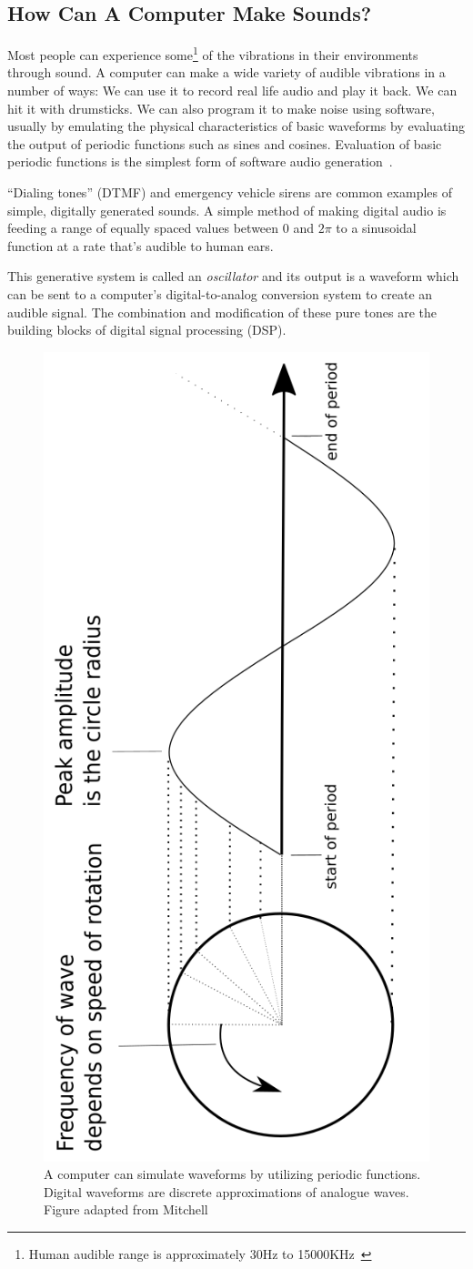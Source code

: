 \documentclass[\main/thesis.tex]{subfiles}
\begin{document}
\subsection{How Can A Computer Make Sounds?}
\label{sec:computer_make_sound}
Most people can experience some\footnote{Human audible range is approximately 30Hz to 15000KHz~\cite{zwicker1961subdivision}} of the vibrations in their environments through sound. A computer can make a wide variety of audible vibrations in a number of ways: We can use it to record real life audio and play it back. We can hit it with drumsticks. We can also program it to make noise using software, usually by emulating the physical characteristics of basic waveforms by evaluating the output of periodic functions such as sines and cosines. Evaluation of basic periodic functions is the simplest form of software audio generation~\cite{mitchell2009basicsynthChap5}.

\enquote{Dialing tones} (DTMF) and emergency vehicle sirens are common examples of simple, digitally generated sounds. A simple method of making digital audio is feeding a range of equally spaced values between 0 and $2\pi$ to a sinusoidal function at a rate that's audible to human ears. 

This generative system is called an \textit{oscillator} and its output is a waveform which can be sent to a computer's digital-to-analog conversion system to create an audible signal. The combination and modification of these pure tones are the building blocks of digital signal processing (DSP).


\begin{figure}[h]
\label{fig_example_sine}
\centering
\includegraphics[width=0.45\linewidth,angle =-90 ]{images/periodic_function.png}
\caption{A computer can simulate waveforms by utilizing periodic functions. Digital waveforms are discrete approximations of analogue waves. Figure adapted from Mitchell~\cite{mitchell2009basicsynthChap5} }
\end{figure}
\end{document}
